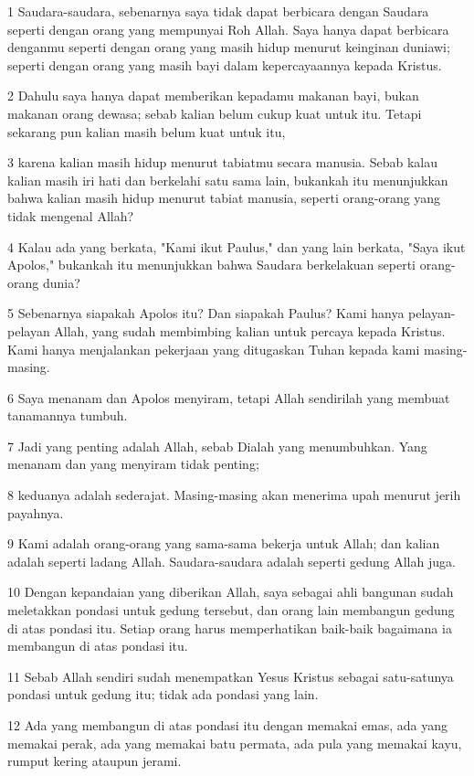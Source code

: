 \par 1 Saudara-saudara, sebenarnya saya tidak dapat berbicara dengan Saudara seperti dengan orang yang mempunyai Roh Allah. Saya hanya dapat berbicara denganmu seperti dengan orang yang masih hidup menurut keinginan duniawi; seperti dengan orang yang masih bayi dalam kepercayaannya kepada Kristus.
\par 2 Dahulu saya hanya dapat memberikan kepadamu makanan bayi, bukan makanan orang dewasa; sebab kalian belum cukup kuat untuk itu. Tetapi sekarang pun kalian masih belum kuat untuk itu,
\par 3 karena kalian masih hidup menurut tabiatmu secara manusia. Sebab kalau kalian masih iri hati dan berkelahi satu sama lain, bukankah itu menunjukkan bahwa kalian masih hidup menurut tabiat manusia, seperti orang-orang yang tidak mengenal Allah?
\par 4 Kalau ada yang berkata, "Kami ikut Paulus," dan yang lain berkata, "Saya ikut Apolos," bukankah itu menunjukkan bahwa Saudara berkelakuan seperti orang-orang dunia?
\par 5 Sebenarnya siapakah Apolos itu? Dan siapakah Paulus? Kami hanya pelayan-pelayan Allah, yang sudah membimbing kalian untuk percaya kepada Kristus. Kami hanya menjalankan pekerjaan yang ditugaskan Tuhan kepada kami masing-masing.
\par 6 Saya menanam dan Apolos menyiram, tetapi Allah sendirilah yang membuat tanamannya tumbuh.
\par 7 Jadi yang penting adalah Allah, sebab Dialah yang menumbuhkan. Yang menanam dan yang menyiram tidak penting;
\par 8 keduanya adalah sederajat. Masing-masing akan menerima upah menurut jerih payahnya.
\par 9 Kami adalah orang-orang yang sama-sama bekerja untuk Allah; dan kalian adalah seperti ladang Allah. Saudara-saudara adalah seperti gedung Allah juga.
\par 10 Dengan kepandaian yang diberikan Allah, saya sebagai ahli bangunan sudah meletakkan pondasi untuk gedung tersebut, dan orang lain membangun gedung di atas pondasi itu. Setiap orang harus memperhatikan baik-baik bagaimana ia membangun di atas pondasi itu.
\par 11 Sebab Allah sendiri sudah menempatkan Yesus Kristus sebagai satu-satunya pondasi untuk gedung itu; tidak ada pondasi yang lain.
\par 12 Ada yang membangun di atas pondasi itu dengan memakai emas, ada yang memakai perak, ada yang memakai batu permata, ada pula yang memakai kayu, rumput kering ataupun jerami.

